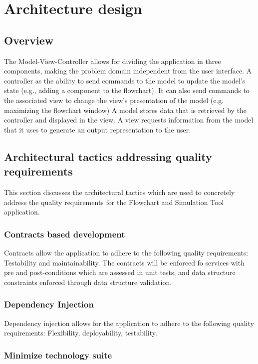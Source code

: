 \section{Architecture design}

\subsection{Overview}

The Model-View-Controller allows for dividing the application in three components, making the problem domain independent from the user interface.
A controller as the ability to send commands to the model to update the model's state (e.g., adding a component to the flowchart). It can also send commands to the associated view to change the view's presentation of the model (e.g. maximizing the flowchart window)
A model stores data that is retrieved by the controller and displayed in the view.
A view requests information from the model that it uses to generate an output representation to the user.


\subsection{Architectural tactics addressing quality requirements}

This section discusses the architectural tactics which are used to concretely address the quality requirements for the Flowchart and Simulation Tool application.

\subsubsection{Contracts based development}

Contracts allow the application to adhere to the following quality requirements:
Testability and maintainability.
The contracts will be enforced fo services  with pre and post-conditions which are assessed in unit tests, and data structure constraints enforced through data structure validation.

\subsubsection{Dependency Injection}

Dependency injection allows for the application to adhere to the following quality requirements:
Flexibility, deployability, testability.

\subsubsection{Minimize technology suite}

